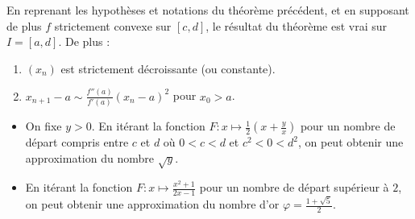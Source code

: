 	\begin{corollary}
		En reprenant les hypothèses et notations du théorème précédent, et en supposant de plus $f$ strictement convexe sur $[c, d]$, le résultat du théorème est vrai sur $I = [a, d]$. De plus :
		\begin{enumerate}[label=(\roman*)]
			\item $(x_n)$ est strictement décroissante (ou constante).
			\item $x_{n+1} - a \sim \frac{f''(a)}{f'(a)} (x_n - a)^2$ pour $x_0 > a$.
		\end{enumerate}
	\end{corollary}

	\begin{example}
  	\begin{itemize}
  		\item On fixe $y > 0$. En itérant la fonction $F : x \mapsto \frac{1}{2} \left( x + \frac{y}{x} \right)$ pour un nombre de départ compris entre $c$ et $d$ où $0 < c < d$ et $c^2 < 0 < d^2$, on peut obtenir une approximation du nombre $\sqrt{y}$.
  		\item En itérant la fonction $F : x \mapsto \frac{x^2+1}{2x-1}$ pour un nombre de départ supérieur à $2$, on peut obtenir une approximation du nombre d'or $\varphi = \frac{1+\sqrt{5}}{2}$.
  	\end{itemize}
  \end{example}

